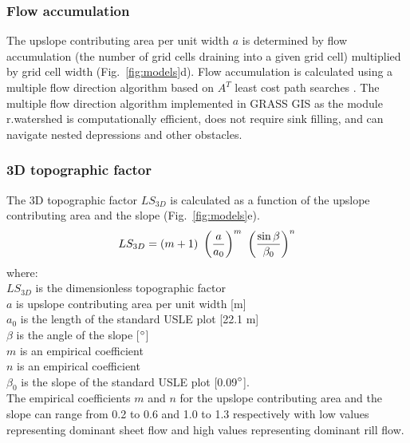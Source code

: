 \documentclass[gmd, manuscript]{copernicus}
\begin{document}

\subsubsection{Flow accumulation}
%
The upslope contributing area per unit width $a$
is determined by flow accumulation 
(the number of grid cells draining into a given grid cell)
multiplied by grid cell width (Fig.~\ref{fig:models}d). 
Flow accumulation is calculated using 
a multiple flow direction algorithm \citep{Metz2009} 
based on $A^{T}$ least cost path searches \citep{Ehlschlaeger1989}. 
The multiple flow direction algorithm 
implemented in GRASS GIS as the module r.watershed
is computationally efficient, does not require sink filling, 
and can navigate nested depressions and other obstacles. 


\subsubsection{3D topographic factor}
The 3D topographic factor $LS_{3D}$
is calculated as a function of the upslope contributing area
and the slope (Fig.~\ref{fig:models}e). 
\begin{equation}
\label{eq:ls_factor}
LS_{3D} = (m+1) ~ \left({a \over a_0}\right)^m ~ \left({\sin \beta \over \beta_0}\right)^n
\end{equation}
%
{\small
\noindent
where: \\
\noindent
\hspace*{0.5em} $LS_{3D}$ is the dimensionless topographic factor\\
\hspace*{0.5em} $a$ is upslope contributing area per unit width [\unit{m}]\\
\hspace*{0.5em} $a_0$ is the length of the standard USLE plot [22.1 \unit{m}]\\
\hspace*{0.5em} $\beta$ is the angle of the slope [$^{\circ}$]\\
\hspace*{0.5em} $m$ is an empirical coefficient\\
\hspace*{0.5em} $n$ is an empirical coefficient\\
\hspace*{0.5em} $\beta_0$ is the slope of the standard USLE plot [0.09$^{\circ}$].\\
}
The empirical coefficients $m$ and $n$
for the upslope contributing area and the slope
can range from 0.2 to 0.6 and 1.0 to 1.3 respectively
with low values representing dominant sheet flow
and high values representing dominant rill flow.
\end{document}
